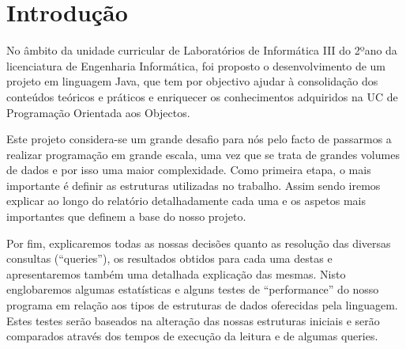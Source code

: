 \chapter{Introdução}

No âmbito da unidade curricular de Laboratórios de Informática III do 2ºano da licenciatura de Engenharia Informática, foi proposto o desenvolvimento de um projeto em linguagem Java, que tem por objectivo ajudar à consolidação dos conteúdos teóricos e práticos e enriquecer os conhecimentos adquiridos na UC de Programação Orientada aos Objectos.

Este projeto considera-se um grande desafio para nós pelo facto de passarmos a realizar
programação em grande escala, uma vez que se trata de grandes volumes de dados e por isso uma maior complexidade.
Como primeira etapa, o mais importante é definir as estruturas utilizadas no trabalho. Assim sendo iremos explicar ao longo do relatório detalhadamente cada uma e os aspetos mais importantes que definem a base do nosso projeto.


Por fim, explicaremos todas as nossas decisões quanto as resolução das diversas consultas
(“queries”), os resultados obtidos para cada uma destas e apresentaremos também uma detalhada explicação das mesmas. Nisto englobaremos algumas estatísticas e alguns testes de “performance” do nosso programa em relação aos tipos de estruturas de dados oferecidas pela linguagem. Estes testes serão baseados na alteração das nossas estruturas iniciais e serão comparados através dos tempos de execução da leitura e de algumas queries. 




